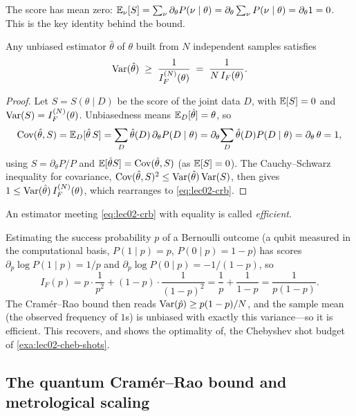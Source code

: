 The score has mean zero: $\mathbb{E}_\nu[S]=\sum_\nu\partial_\theta P(\nu\mid\theta)
=\partial_\theta\sum_\nu P(\nu\mid\theta)=\partial_\theta 1=0$. This is the key
identity behind the bound.

\begin{theorem}\label{thm:lec02-crb}
Any unbiased estimator $\hat\theta$ of $\theta$ built from $N$ independent samples
satisfies
\begin{equation}\label{eq:lec02-crb}
  \operatorname{Var}(\hat\theta)\;\ge\;\frac{1}{I_F^{(N)}(\theta)}\;=\;\frac{1}{N\,I_F(\theta)}.
\end{equation}
\end{theorem}

\begin{proof}
Let $S=S(\theta\mid D)$ be the score of the joint data $D$, with $\mathbb{E}[S]=0$ and
$\operatorname{Var}(S)=I_F^{(N)}(\theta)$. Unbiasedness means $\mathbb{E}_D[\hat\theta]=\theta$, so
\[
  \operatorname{Cov}(\hat\theta,S)=\mathbb{E}_D[\hat\theta\,S]
   =\sum_D\hat\theta(D)\,\partial_\theta P(D\mid\theta)
   =\partial_\theta\!\sum_D\hat\theta(D)P(D\mid\theta)
   =\partial_\theta\,\theta=1,
\]
using $S=\partial_\theta P/P$ and $\mathbb{E}[\hat\theta S]=\operatorname{Cov}(\hat\theta,S)$ (as
$\mathbb{E}[S]=0$). The Cauchy--Schwarz inequality for covariance,
$\operatorname{Cov}(\hat\theta,S)^{2}\le\operatorname{Var}(\hat\theta)\operatorname{Var}(S)$, then gives
$1\le\operatorname{Var}(\hat\theta)\,I_F^{(N)}(\theta)$, which rearranges to
\eqref{eq:lec02-crb}.
\end{proof}

An estimator meeting \eqref{eq:lec02-crb} with equality is called \emph{efficient}.

\begin{example}\label{exa:lec02-coin}
Estimating the success probability $p$ of a Bernoulli outcome (a qubit measured in
the computational basis, $P(1\mid p)=p$, $P(0\mid p)=1-p$) has scores
$\partial_p\log P(1\mid p)=1/p$ and $\partial_p\log P(0\mid p)=-1/(1-p)$, so
\[
  I_F(p)=p\cdot\frac{1}{p^{2}}+(1-p)\cdot\frac{1}{(1-p)^{2}}
        =\frac1p+\frac1{1-p}=\frac{1}{p(1-p)}.
\]
The Cram\'er--Rao bound then reads $\operatorname{Var}(\hat p)\ge p(1-p)/N$, and the sample mean
(the observed frequency of $1$s) is unbiased with exactly this variance---so it is
efficient. This recovers, and shows the optimality of, the Chebyshev shot budget of
\cref{exa:lec02-cheb-shots}.
\end{example}

\subsection{The quantum Cram\'er--Rao bound and metrological scaling}

